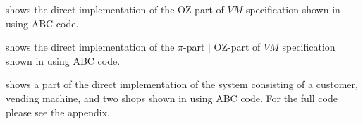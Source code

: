 

 shows the direct implementation of the OZ-part of $VM$ specification shown in  using ABC code.



 shows the direct implementation of the $\pi$-part $\mid$ OZ-part of $VM$ specification shown in  using ABC code.



 shows a part of the direct implementation of the system consisting of a customer, vending machine, and two shops shown in  using ABC code.
For the full code please see the appendix.

